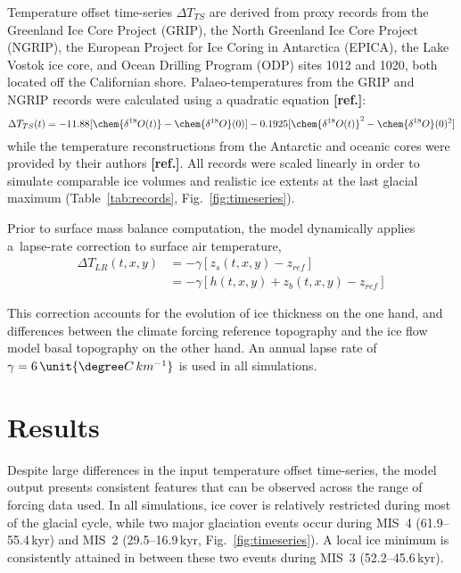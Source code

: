 \documentclass[tc, ms]{copernicus}
\newcommand{\aref}[0]{\textbf{[ref.]}}
\begin{document}
Temperature offset time-series ${\Delta}T_{TS}$ are derived from proxy records from
the Greenland Ice Core Project (GRIP), the North Greenland Ice Core Project
(NGRIP), the European Project for Ice Coring in Antarctica (EPICA), the Lake
Vostok ice core, and Ocean Drilling Program (ODP) sites 1012 and 1020, both
located off the Californian shore. Palaeo-temperatures from the GRIP and NGRIP
records were calculated using a quadratic equation \aref:
\begin{equation}
    {\Delta}T_{TS}(t) = -11.88[\chem{\delta^{18}O(t)}-\chem{\delta^{18}O}(0)]
                        -0.1925[\chem{\delta^{18}O(t)}^2-\chem{\delta^{18}O}(0)^2]
\end{equation}
while the temperature reconstructions from the Antarctic and oceanic cores were
provided by their authors \aref. All records were scaled linearly in
order to simulate comparable ice volumes and realistic ice extents at the last
glacial maximum (Table~\ref{tab:records}, Fig.~\ref{fig:timeseries}).

Prior to surface mass balance computation, the model dynamically applies
a~lapse-rate correction to surface air temperature,
\begin{align}
    {\Delta}T_{LR}(t, x, y) &= -\gamma [z_{s}(t, x, y)-z_{ref}] \\
                            &= -\gamma [h(t, x, y)+z_{b}(t, x, y)-z_{ref}]
\end{align}


This correction accounts
for the evolution of ice thickness on the one hand, and differences between the
climate forcing reference topography and the ice flow model basal topography on
the other hand. An annual lapse rate of
$\gamma = 6\,\unit{{\degree}C\,km^{-1}}$
is used in all simulations.


\section{Results}
\label{sec:results}

Despite large differences in the input temperature offset time-series, the
model output presents consistent features that can be observed across the range
of forcing data used. In all simulations, ice cover is relatively restricted
during most of the glacial cycle, while two major glaciation events occur
during MIS~4 (61.9--55.4\,\unit{kyr}) and MIS~2 (29.5--16.9\,\unit{kyr},
Fig.~\ref{fig:timeseries}). A local ice minimum is consistently attained in between these
two events during MIS~3 (52.2--45.6\,\unit{kyr}).
\end{document}
